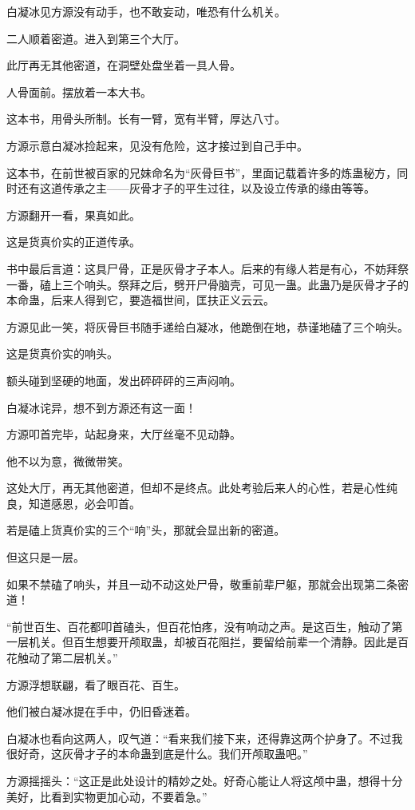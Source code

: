 \begin{this_body}
白凝冰见方源没有动手，也不敢妄动，唯恐有什么机关。

二人顺着密道。进入到第三个大厅。

此厅再无其他密道，在洞壁处盘坐着一具人骨。

人骨面前。摆放着一本大书。

这本书，用骨头所制。长有一臂，宽有半臂，厚达八寸。

方源示意白凝冰捡起来，见没有危险，这才接过到自己手中。

这本书，在前世被百家的兄妹命名为“灰骨巨书”，里面记载着许多的炼蛊秘方，同时还有这道传承之主——灰骨才子的平生过往，以及设立传承的缘由等等。

方源翻开一看，果真如此。

这是货真价实的正道传承。

书中最后言道：这具尸骨，正是灰骨才子本人。后来的有缘人若是有心，不妨拜祭一番，磕上三个响头。祭拜之后，劈开尸骨脑壳，可见一蛊。此蛊乃是灰骨才子的本命蛊，后来人得到它，要造福世间，匡扶正义云云。

方源见此一笑，将灰骨巨书随手递给白凝冰，他跪倒在地，恭谨地磕了三个响头。

这是货真价实的响头。

额头碰到坚硬的地面，发出砰砰砰的三声闷响。

白凝冰诧异，想不到方源还有这一面！

方源叩首完毕，站起身来，大厅丝毫不见动静。

他不以为意，微微带笑。

这处大厅，再无其他密道，但却不是终点。此处考验后来人的心性，若是心性纯良，知道感恩，必会叩首。

若是磕上货真价实的三个“响”头，那就会显出新的密道。

但这只是一层。

如果不禁磕了响头，并且一动不动这处尸骨，敬重前辈尸躯，那就会出现第二条密道！

“前世百生、百花都叩首磕头，但百花怕疼，没有响动之声。是这百生，触动了第一层机关。但百生想要开颅取蛊，却被百花阻拦，要留给前辈一个清静。因此是百花触动了第二层机关。”

方源浮想联翩，看了眼百花、百生。

他们被白凝冰提在手中，仍旧昏迷着。

白凝冰也看向这两人，叹气道：“看来我们接下来，还得靠这两个护身了。不过我很好奇，这灰骨才子的本命蛊到底是什么。我们开颅取蛊吧。”

方源摇摇头：“这正是此处设计的精妙之处。好奇心能让人将这颅中蛊，想得十分美好，比看到实物更加心动，不要着急。”


\end{this_body}
